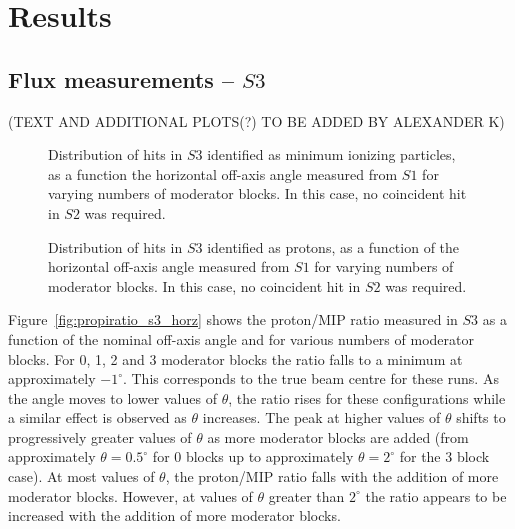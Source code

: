 \section{Results}
\label{hptpcPaper:sec:Results}

	\subsection{Flux measurements -- $S3$}
(TEXT AND ADDITIONAL PLOTS(?) TO BE ADDED BY ALEXANDER K)
	
	\begin{figure}[h]
		\begin{minipage}{0.48\textwidth}
			\begin{adjustbox}{max totalsize={\textwidth}{.35\textheight},center}
				
			\end{adjustbox}
			\caption{Distribution of hits in $S3$ identified as minimum ionizing particles, as a function the horizontal off-axis angle measured from $S1$ for varying numbers of moderator blocks. In this case, no coincident hit in $S2$ was required.}
			\label{fig:s1s3mips}
		\end{minipage}
		\hspace{0.3cm}
		\begin{minipage}{0.48\textwidth}
			\begin{adjustbox}{max totalsize={\textwidth}{.35\textheight},center}
				
			\end{adjustbox}
			\caption{Distribution of hits in $S3$ identified as protons, as a function of the horizontal off-axis angle measured from $S1$ for varying numbers of moderator blocks. In this case, no coincident hit in $S2$ was required.}
			\label{fig:s1s3protons}
		\end{minipage}
	\end{figure}

	Figure~\ref{fig:propiratio_s3_horz} shows the proton/MIP ratio measured in $S3$ as a function of the nominal off-axis angle and for various numbers of moderator blocks.
	For 0, 1, 2 and 3 moderator blocks the ratio falls to a minimum at approximately $-1^{\circ}$. This corresponds to the true beam centre for these runs.
	As the angle moves to lower values of $\theta$, the ratio rises for these configurations while a similar effect is observed as $\theta$ increases.
	The peak at higher values of $\theta$ shifts to progressively greater values of $\theta$ as more moderator blocks are added (from approximately $\theta = 0.5^{\circ}$ for 0 blocks up to approximately $\theta = 2^{\circ}$ for the 3 block case).
	At most values of $\theta$, the proton/MIP ratio falls with the addition of more moderator blocks. 
	However, at values of $\theta$ greater than $2^{\circ}$ the ratio appears to be increased with the addition of more moderator blocks.

